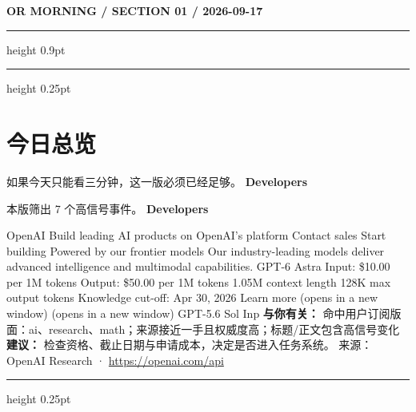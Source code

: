\documentclass[10.5pt]{ctexart}
\begin{document}
{\small\bfseries OR MORNING / SECTION 01 / 2026-09-17}
\vspace{2mm}
\hrule height 0.9pt
\vspace{1.5mm}
\hrule height 0.25pt
\vspace{4mm}
\section*{今日总览}
{\color{ormuted} 如果今天只能看三分钟，这一版必须已经足够。}
\vspace{2mm}
{\fontsize{25}{29}\selectfont\bfseries Developers}\par
\vspace{2mm}
{\large 本版筛出 7 个高信号事件。}
\vspace{3mm}
{\Large\bfseries Developers}\par
OpenAI Build leading AI products on OpenAI’s platform Contact sales Start building Powered by our frontier models Our industry-leading models deliver advanced intelligence and multimodal capabilities. GPT-6 Astra Input: \$10.00 per 1M tokens Output: \$50.00 per 1M tokens 1.05M context length 128K max output tokens Knowledge cut-off: Apr 30, 2026 Learn more (opens in a new window) (opens in a new window) GPT-5.6 Sol Inp
\textbf{与你有关：} 命中用户订阅版面：ai、research、math；来源接近一手且权威度高；标题/正文包含高信号变化
\textbf{建议：} 检查资格、截止日期与申请成本，决定是否进入任务系统。
{\footnotesize\color{ormuted} 来源：OpenAI Research · \url{https://openai.com/api}}
\vspace{3mm}
\hrule height 0.25pt
\vspace{3mm}
\end{document}
